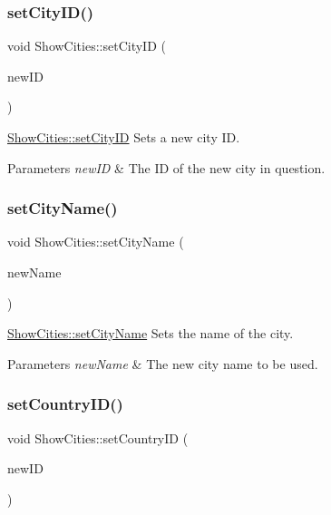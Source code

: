 \subsubsection{\texorpdfstring{set\+City\+I\+D()}{setCityID()}}
{\footnotesize\ttfamily void Show\+Cities\+::set\+City\+ID (\begin{DoxyParamCaption}\item[{int}]{new\+ID }\end{DoxyParamCaption})}



\mbox{\hyperlink{class_show_cities_acd17480ad6a64e989e9aa0b07d30141b}{Show\+Cities\+::set\+City\+ID}} Sets a new city ID. 


\begin{DoxyParams}{Parameters}
{\em new\+ID} & The ID of the new city in question. \\
\hline
\end{DoxyParams}
\mbox{\label{class_show_cities_acadd6c1bdb26d30e796bab4b5b2acfd9}} 
\subsubsection{\texorpdfstring{set\+City\+Name()}{setCityName()}}
{\footnotesize\ttfamily void Show\+Cities\+::set\+City\+Name (\begin{DoxyParamCaption}\item[{Q\+String}]{new\+Name }\end{DoxyParamCaption})}



\mbox{\hyperlink{class_show_cities_acadd6c1bdb26d30e796bab4b5b2acfd9}{Show\+Cities\+::set\+City\+Name}} Sets the name of the city. 


\begin{DoxyParams}{Parameters}
{\em new\+Name} & The new city name to be used. \\
\hline
\end{DoxyParams}
\mbox{\label{class_show_cities_a853a958ebc2c0d42d872c237d431fe25}} 
\subsubsection{\texorpdfstring{set\+Country\+I\+D()}{setCountryID()}}
{\footnotesize\ttfamily void Show\+Cities\+::set\+Country\+ID (\begin{DoxyParamCaption}\item[{int}]{new\+ID }\end{DoxyParamCaption})}




